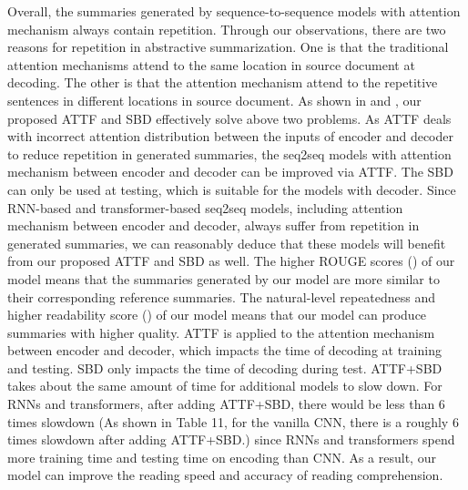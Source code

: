 Overall, the summaries generated by sequence-to-sequence models with attention mechanism always contain repetition.  
Through our observations, there are two reasons for repetition in abstractive summarization.
One is that the traditional attention mechanisms attend to the same location in source document at decoding.
The other is that the attention mechanism attend to the repetitive sentences in different locations in source document. 
As shown in  and ,
our proposed ATTF and SBD effectively solve above two problems.  
As ATTF deals with incorrect attention distribution
between the inputs of encoder and decoder to 
reduce repetition in generated summaries,
the seq2seq models with attention mechanism between encoder and decoder
can be improved via ATTF.
The SBD can only be used at testing, which is suitable for the models with decoder.
Since RNN-based and transformer-based seq2seq models,
including attention mechanism between encoder and decoder,
always suffer from repetition in generated summaries, 
we can reasonably deduce that these models will benefit from our proposed ATTF and SBD as well.
The higher ROUGE scores () of our model means that
the summaries generated by our model are more similar to their corresponding reference summaries.
The natural-level repeatedness and higher readability score () of our model means 
that our model can produce summaries with higher quality.
ATTF is applied to the attention mechanism between encoder and decoder,
which impacts the time of decoding at training and testing.
SBD only impacts the time of decoding during test.
ATTF+SBD takes about the same amount of time for additional models to slow down.
For RNNs and transformers, after adding ATTF+SBD,
there would be less than 6 times slowdown
(As shown in Table 11, for the vanilla CNN, there is a roughly 6 times slowdown after adding ATTF+SBD.)
since RNNs and transformers spend more training time and testing time on encoding than CNN.
As a result, our model can improve the reading speed and accuracy of reading comprehension.


